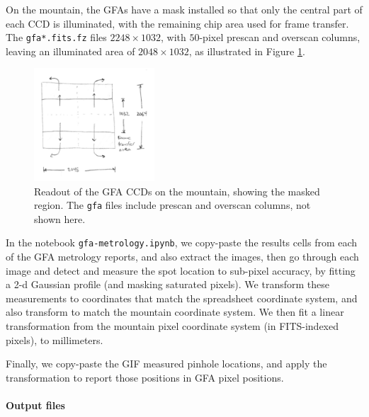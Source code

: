 \documentclass[10pt]{article}
\newcommand{\code}[1]{\texttt{#1}}
\begin{document}
On the mountain, the GFAs have a mask installed so that only the
central part of each CCD is illuminated, with the remaining chip area
used for frame transfer.  The \code{gfa*.fits.fz} files $2248 \times
1032$, with $50$-pixel prescan and overscan columns, leaving an
illuminated area of $2048 \times 1032$, as illustrated in Figure
\ref{fig:mountain}.

\begin{figure}[h!]
  \begin{center}
    \includegraphics[width=0.4\textwidth]{gfa-metrology2.jpeg}
  \end{center}
  \caption{\label{fig:mountain}Readout of the GFA CCDs on the
    mountain, showing the masked region.  The \code{gfa} files include
    prescan and overscan columns, not shown here.}
\end{figure}

In the notebook \code{gfa-metrology.ipynb}, we copy-paste the results
cells from each of the GFA metrology reports, and also extract the
images, then go through each image and detect and measure the spot
location to sub-pixel accuracy, by fitting a 2-d Gaussian profile (and
masking saturated pixels).  We transform these measurements to
coordinates that match the spreadsheet coordinate system, and also
transform to match the mountain coordinate system.  We then fit a
linear transformation from the mountain pixel coordinate system (in
FITS-indexed pixels), to millimeters.

Finally, we copy-paste the GIF measured pinhole locations, and apply
the transformation to report those positions in GFA pixel positions.

\paragraph{Output files}
\end{document}
